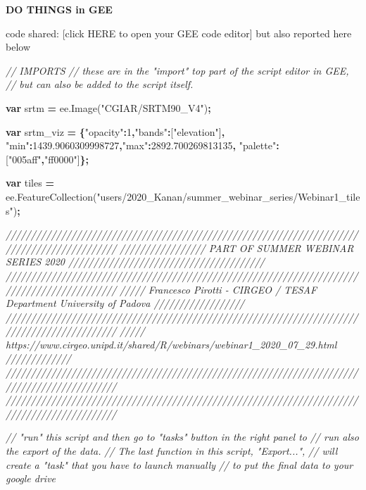 \documentclass[]{article}
\newenvironment{Shaded}{\begin{snugshade}}{\end{snugshade}}
\newcommand{\AttributeTok}[1]{\textcolor[rgb]{0.77,0.63,0.00}{#1}}
\newcommand{\CommentTok}[1]{\textcolor[rgb]{0.56,0.35,0.01}{\textit{#1}}}
\newcommand{\DecValTok}[1]{\textcolor[rgb]{0.00,0.00,0.81}{#1}}
\newcommand{\FloatTok}[1]{\textcolor[rgb]{0.00,0.00,0.81}{#1}}
\newcommand{\KeywordTok}[1]{\textcolor[rgb]{0.13,0.29,0.53}{\textbf{#1}}}
\newcommand{\NormalTok}[1]{#1}
\newcommand{\OperatorTok}[1]{\textcolor[rgb]{0.81,0.36,0.00}{\textbf{#1}}}
\newcommand{\StringTok}[1]{\textcolor[rgb]{0.31,0.60,0.02}{#1}}
\newcommand{\VariableTok}[1]{\textcolor[rgb]{0.00,0.00,0.00}{#1}}
\begin{document}
\textbf{DO THINGS in GEE}

code shared: {[}click HERE to open your GEE code editor{]} but also
reported here below

\begin{Shaded}
\begin{Highlighting}[]
\CommentTok{// IMPORTS }
\CommentTok{// these are in the "import" top part of the script editor in GEE, }
\CommentTok{// but can also be added to the script itself.}

\KeywordTok{var}\NormalTok{ srtm }\OperatorTok{=} \VariableTok{ee}\NormalTok{.}\AttributeTok{Image}\NormalTok{(}\StringTok{"CGIAR/SRTM90_V4"}\NormalTok{)}\OperatorTok{;}

\KeywordTok{var}\NormalTok{  srtm_viz }\OperatorTok{=} \OperatorTok{\{}\StringTok{"opacity"}\OperatorTok{:}\DecValTok{1}\OperatorTok{,}\StringTok{"bands"}\OperatorTok{:}\NormalTok{[}\StringTok{"elevation"}\NormalTok{]}\OperatorTok{,}
      \StringTok{"min"}\OperatorTok{:}\FloatTok{1439.9060309998727}\OperatorTok{,}\StringTok{"max"}\OperatorTok{:}\FloatTok{2892.700269813135}\OperatorTok{,}
      \StringTok{"palette"}\OperatorTok{:}\NormalTok{[}\StringTok{"005aff"}\OperatorTok{,}\StringTok{"ff0000"}\NormalTok{]}\OperatorTok{\};} 

\KeywordTok{var}\NormalTok{ tiles }\OperatorTok{=} \VariableTok{ee}\NormalTok{.}\AttributeTok{FeatureCollection}\NormalTok{(}\StringTok{"users/2020_Kanan/summer_webinar_series/Webinar1_tiles"}\NormalTok{)}\OperatorTok{;}


\CommentTok{////////////////////////////////////////////////////////////////////////////////////////////}
\CommentTok{///////////////// PART OF SUMMER WEBINAR SERIES 2020 /////////////////////////////////////// }
\CommentTok{////////////////////////////////////////////////////////////////////////////////////////////}
\CommentTok{/////  Francesco Pirotti - CIRGEO / TESAF Department University of Padova //////////////////}
\CommentTok{////////////////////////////////////////////////////////////////////////////////////////////}
\CommentTok{/////  https://www.cirgeo.unipd.it/shared/R/webinars/webinar1_2020_07_29.html  /////////////}
\CommentTok{////////////////////////////////////////////////////////////////////////////////////////////}
\CommentTok{////////////////////////////////////////////////////////////////////////////////////////////}

 

\CommentTok{// "run" this script and then go to "tasks" button in the right panel to }
\CommentTok{// run also the export of the data. }
\CommentTok{// The last function in this script, "Export...", }
\CommentTok{// will create a "task" that you have to launch manually }
\CommentTok{// to put the final data  to your google drive}



\end{Highlighting}
\end{Shaded}
\end{document}
